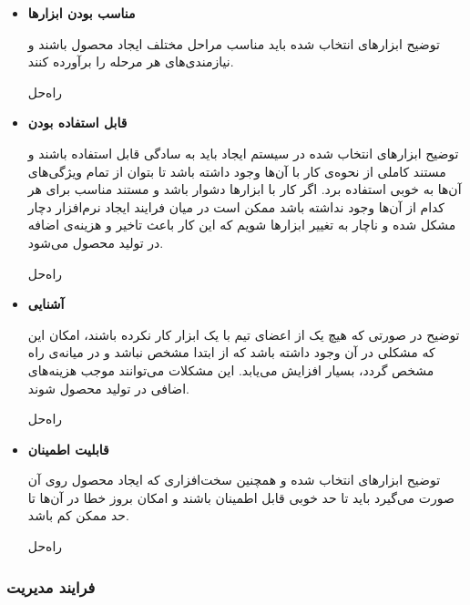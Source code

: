 \begin{itemize}
	
\item 
\textbf{مناسب بودن ابزارها}


توضیح \hspace*{1cm} 
ابزارهای انتخاب شده باید مناسب مراحل مختلف ایجاد محصول باشند و نیازمندی‌های هر مرحله را برآورده کنند.

راه‌حل \hspace*{1cm} 

\item 
\textbf{قابل استفاده بودن}


توضیح \hspace*{1cm} 
ابزارهای انتخاب شده در سیستم ایجاد باید به سادگی قابل استفاده باشند و مستند کاملی از نحوه‌ی کار با آن‌ها وجود داشته باشد تا بتوان از تمام ویژگی‌های آن‌ها به خوبی استفاده برد. اگر کار با ابزارها دشوار باشد و مستند مناسب برای هر کدام از آن‌ها وجود نداشته باشد ممکن است در میان فرایند ایجاد نرم‌افزار دچار مشکل شده و ناچار به تغییر ابزارها شویم که این کار باعث تاخیر و هزینه‌ی اضافه در تولید محصول می‌شود.

راه‌حل \hspace*{1cm} 
\item 
\textbf{آشنایی}


توضیح \hspace*{1cm} 
در صورتی که هیچ یک از اعضای تیم با یک ابزار کار نکرده باشند، امکان این که مشکلی در آن وجود داشته باشد که از ابتدا مشخص نباشد و در میانه‌ی راه مشخص گردد، بسیار افزایش می‌یابد. این مشکلات می‌توانند موجب هزینه‌های اضافی در تولید محصول شوند.

راه‌حل \hspace*{1cm} 

\item 
\textbf{قابلیت اطمینان}

توضیح \hspace*{1cm} 
ابزارهای انتخاب شده و همچنین سخت‌افزاری که ایجاد محصول روی آن صورت می‌گیرد باید تا حد خوبی قابل اطمینان باشند و امکان بروز خطا در آن‌ها تا حد ممکن کم باشد. 

راه‌حل \hspace*{1cm} 

	
\end{itemize}

\subsubsection{فرایند مدیریت}

